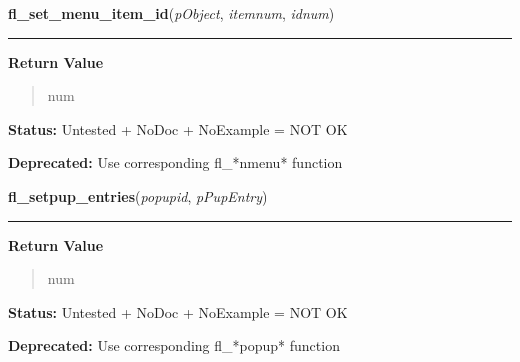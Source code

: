     \label{xformslib:deprecated:fl_set_menu_item_id}

    \vspace{0.5ex}

\hspace{.8\funcindent}\begin{boxedminipage}{\funcwidth}

    \raggedright \textbf{fl\_set\_menu\_item\_id}(\textit{pObject}, \textit{itemnum}, \textit{idnum})

    \vspace{-1.5ex}

    \rule{\textwidth}{0.5\fboxrule}
\setlength{\parskip}{2ex}
\setlength{\parskip}{1ex}
      \textbf{Return Value}
    \vspace{-1ex}

      \begin{quote}
      num

      \end{quote}

\textbf{Status:} Untested + NoDoc + NoExample = NOT OK



\textbf{Deprecated:} Use corresponding fl\_*nmenu* function



    \end{boxedminipage}

    \label{xformslib:deprecated:fl_setpup_entries}

    \vspace{0.5ex}

\hspace{.8\funcindent}\begin{boxedminipage}{\funcwidth}

    \raggedright \textbf{fl\_setpup\_entries}(\textit{popupid}, \textit{pPupEntry})

    \vspace{-1.5ex}

    \rule{\textwidth}{0.5\fboxrule}
\setlength{\parskip}{2ex}
\setlength{\parskip}{1ex}
      \textbf{Return Value}
    \vspace{-1ex}

      \begin{quote}
      num

      \end{quote}

\textbf{Status:} Untested + NoDoc + NoExample = NOT OK



\textbf{Deprecated:} Use corresponding fl\_*popup* function



    \end{boxedminipage}

